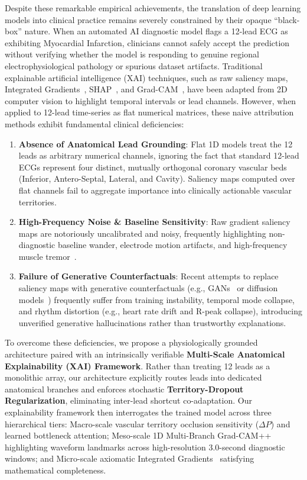 \documentclass[12pt]{elsarticle}
\begin{document}
Despite these remarkable empirical achievements, the translation of deep learning models into clinical practice remains severely constrained by their opaque ``black-box'' nature. When an automated AI diagnostic model flags a 12-lead ECG as exhibiting Myocardial Infarction, clinicians cannot safely accept the prediction without verifying whether the model is responding to genuine regional electrophysiological pathology or spurious dataset artifacts. Traditional explainable artificial intelligence (XAI) techniques, such as raw saliency maps, Integrated Gradients~\cite{sundararajan2017axiomatic}, SHAP~\cite{lundberg2017unified}, and Grad-CAM~\cite{selvaraju2017grad}, have been adapted from 2D computer vision to highlight temporal intervals or lead channels. However, when applied to 12-lead time-series as flat numerical matrices, these naive attribution methods exhibit fundamental clinical deficiencies:
\begin{enumerate}
    \item \textbf{Absence of Anatomical Lead Grounding}: Flat 1D models treat the 12 leads as arbitrary numerical channels, ignoring the fact that standard 12-lead ECGs represent four distinct, mutually orthogonal coronary vascular beds (Inferior, Antero-Septal, Lateral, and Cavity). Saliency maps computed over flat channels fail to aggregate importance into clinically actionable vascular territories.
    \item \textbf{High-Frequency Noise \& Baseline Sensitivity}: Raw gradient saliency maps are notoriously uncalibrated and noisy, frequently highlighting non-diagnostic baseline wander, electrode motion artifacts, and high-frequency muscle tremor~\cite{ismail2020benchmarking, tonekaboni2020went}.
    \item \textbf{Failure of Generative Counterfactuals}: Recent attempts to replace saliency maps with generative counterfactuals (e.g., GANs~\cite{korkmaz2021deep} or diffusion models~\cite{neifar2024diffecg}) frequently suffer from training instability, temporal mode collapse, and rhythm distortion (e.g., heart rate drift and R-peak collapse), introducing unverified generative hallucinations rather than trustworthy explanations.
\end{enumerate}

To overcome these deficiencies, we propose a physiologically grounded architecture paired with an intrinsically verifiable \textbf{Multi-Scale Anatomical Explainability (XAI) Framework}. Rather than treating 12 leads as a monolithic array, our architecture explicitly routes leads into dedicated anatomical branches and enforces stochastic \textbf{Territory-Dropout Regularization}, eliminating inter-lead shortcut co-adaptation. Our explainability framework then interrogates the trained model across three hierarchical tiers: Macro-scale vascular territory occlusion sensitivity ($\Delta P$) and learned bottleneck attention; Meso-scale 1D Multi-Branch Grad-CAM++~\cite{chattopadhay2018grad} highlighting waveform landmarks across high-resolution 3.0-second diagnostic windows; and Micro-scale axiomatic Integrated Gradients~\cite{sundararajan2017axiomatic} satisfying mathematical completeness.
\end{document}
